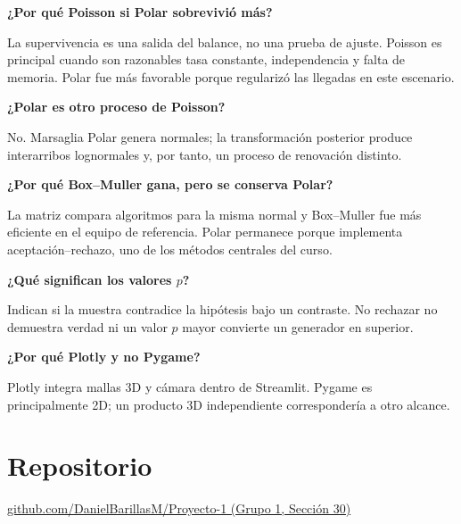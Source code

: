 \documentclass[11pt,a4paper]{article}
\begin{document}
\textbf{¿Por qué Poisson si Polar sobrevivió más?}

La supervivencia es una salida del balance, no una prueba de ajuste. Poisson es
principal cuando son razonables tasa constante, independencia y falta de
memoria. Polar fue más favorable porque regularizó las llegadas en este escenario.

\textbf{¿Polar es otro proceso de Poisson?}

No. Marsaglia Polar genera normales; la transformación posterior produce
interarribos lognormales y, por tanto, un proceso de renovación distinto.

\textbf{¿Por qué Box--Muller gana, pero se conserva Polar?}

La matriz compara algoritmos para la misma normal y Box--Muller fue más
eficiente en el equipo de referencia. Polar permanece porque implementa
aceptación--rechazo, uno de los métodos centrales del curso.

\textbf{¿Qué significan los valores $p$?}

Indican si la muestra contradice la hipótesis bajo un contraste. No rechazar no
demuestra verdad ni un valor $p$ mayor convierte un generador en superior.

\textbf{¿Por qué Plotly y no Pygame?}

Plotly integra mallas 3D y cámara dentro de Streamlit. Pygame es principalmente
2D; un producto 3D independiente correspondería a otro alcance.

\section*{Repositorio}

\href{https://github.com/DanielBarillasM/Proyecto-1_Grupo-1_Modelacion-y-Simulacion_Sec-30}%
{github.com/DanielBarillasM/Proyecto-1 (Grupo 1, Sección 30)}
\end{document}
